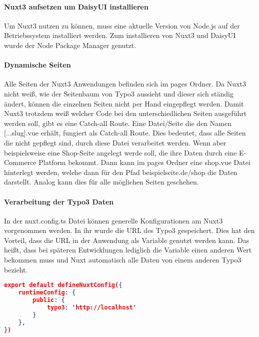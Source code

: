 \paragraph{Nuxt3 aufsetzen um DaisyUI installieren}
Um Nuxt3 nutzen zu können, muss eine aktuelle Version von Node.js auf der Betriebssystem installiert werden. Zum installieren von Nuxt3 und DaisyUI wurde der Node Package Manager genutzt.

\paragraph{Dynamische Seiten}
Alle Seiten der Nuxt3 Anwendungen befinden sich im pages Ordner. Da Nuxt3 nicht weiß, wie der Seitenbaum von Typo3 aussieht und dieser sich ständig ändert, können die einzelnen Seiten nicht per Hand eingepflegt werden. Damit Nuxt3 trotzdem weiß welcher Code bei den unterschiedlichen Seiten ausgeführt werden soll, gibt es eine Catch-all Route. Eine Datei/Seite die den Namen [...slug].vue erhält, fungiert als Catch-all Route. Dies bedeutet, dass alle Seiten die nicht gepflegt sind, durch diese Datei verarbeitet werden. Wenn aber beispielsweise eine Shop-Seite angelegt werde soll, die ihre Daten durch eine E-Commerce Platform bekommt. Dann kann im pages Ordner eine shop.vue Datei hinterlegt werden, welche dann für den Pfad beispielseite.de/shop die Daten darstellt. Analog kann dies für alle möglichen Seiten geschehen.

\paragraph{Verarbeitung der Typo3 Daten}

In der nuxt.config.ts Datei können generelle Konfigurationen am Nuxt3 vorgenommen werden. In ihr wurde die URL des Typo3 gespeichert. Dies hat den Vorteil, dass die URL in der Anwendung als Variable genutzt werden kann. Das heißt, dass bei späteren Entwicklungen lediglich die Variable einen anderen Wert bekommen muss und Nuxt automatisch alle Daten von einem anderen Typo3 bezieht.

\begin{lstlisting}[language=json,firstnumber=1]
export default defineNuxtConfig({
    runtimeConfig: {
        public: {
            typo3: 'http://localhost'
        }
    },
})
\end{lstlisting}


